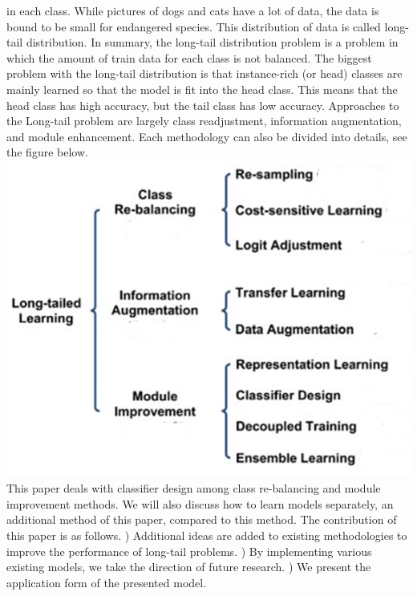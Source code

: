 \documentclass[extendedabs]{bmvc2k}
\begin{document}
  in each class. While pictures of dogs and cats have a lot of data, the data is bound to be small for endangered species. This distribution of data 
  is called long-tail distribution. In summary, the long-tail distribution problem is a problem in which the amount of train data for each class is not balanced.
  \newline
  \newline The biggest problem with the long-tail distribution is that instance-rich (or head) classes are mainly learned so that the model is fit into the 
  head class.\cite{kang2019decoupling} This means that the head class has high accuracy, but the tail class has low accuracy. Approaches to the Long-tail problem are largely class 
  readjustment, information augmentation, and module enhancement. Each methodology can also be divided into details, see the figure below.
  \newline  \includegraphics[width=\linewidth]{images/01_project.PNG}
  This paper deals with classifier design among class re-balancing and module improvement methods. We will also discuss how to learn models separately, an additional method of this paper, 
  compared to this method. The contribution of this paper is as follows. 
  \newline
  ) Additional ideas are added to existing methodologies to improve the performance of long-tail problems.
  ) By implementing various existing models, we take the direction of future research.
  ) We present the application form of the presented model.
\end{document}
